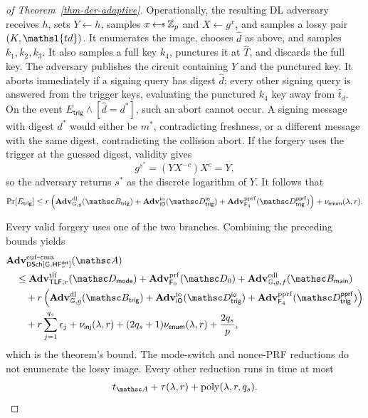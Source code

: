 \begin{proof}[of Theorem~\ref{thm-der-adaptive}]
Operationally, the resulting DL adversary receives $h$, sets $Y\gets h$, samples $x\getsr\Zp$ and $X\gets g^x$, and samples a lossy pair $(K,\mathsl{td})$. It enumerates the image, chooses $\widehat d$ as above, and samples $k_1,k_2,k_3$. It also samples a full key $k_4$, punctures it at $\widehat T$, and discards the full key. The adversary publishes the circuit containing $Y$ and the punctured key. It aborts immediately if a signing query has digest $\widehat d$; every other signing query is answered from the trigger keys, evaluating the punctured $k_4$ key away from $\widehat t_d$. On the event $E_{\mathsf{trig}}\land[\widehat d=d^*]$, such an abort cannot occur. A signing message with digest $d^*$ would either be $m^*$, contradicting freshness, or a different message with the same digest, contradicting the collision abort. If the forgery uses the trigger at the guessed digest, validity gives
$$
g^{s^*}=(YX^{-c})X^c=Y,
$$
so the adversary returns $s^*$ as the discrete logarithm of $Y$. It follows that
$$
\Pr[E_{\mathsf{trig}}]
\le
r\left(
\AdvDL{\GG,g}{\advB_{\mathsf{trig}}}
+\AdvIO{\iO}{\advD^{\mathsf{io}}_{\mathsf{trig}}}
+\AdvPPRF{\PRF_4}{\advD^{\mathsf{pprf}}_{\mathsf{trig}}}
\right)
+\nu_{\mathsf{enum}}(\secp,r).
$$

 Every valid forgery uses one of the two branches. Combining the preceding bounds yields
$$
\begin{aligned}
&\AdvEUFCMA{\SchDScheme[\GG,\HF^{\mathsf{det}}_r]}{\advA}\\
&\quad\le
\AdvTLF{\TLF,r}{\advD_{\mathsf{mode}}}
+\AdvPRF{\PRF_0}{\advD_0}
+\AdvCDL{\GG,g,f}{\advB_{\mathsf{main}}}\\
&\qquad+r\left(
\AdvDL{\GG,g}{\advB_{\mathsf{trig}}}
+\AdvIO{\iO}{\advD^{\mathsf{io}}_{\mathsf{trig}}}
+\AdvPPRF{\PRF_4}{\advD^{\mathsf{pprf}}_{\mathsf{trig}}}
\right)\\
&\qquad+r\sum_{j=1}^{q_s}\epsilon_j
+\nu_{\mathsf{inj}}(\secp,r)
+(2q_s+1)\nu_{\mathsf{enum}}(\secp,r)
+\frac{2q_s}{p},
\end{aligned}
$$
which is the theorem's bound. The mode-switch and nonce-PRF reductions do not enumerate the lossy image. Every other reduction runs in time at most
$$
t_{\advA}+\tau(\secp,r)+\poly(\secp,r,q_s).
$$
\end{proof}

